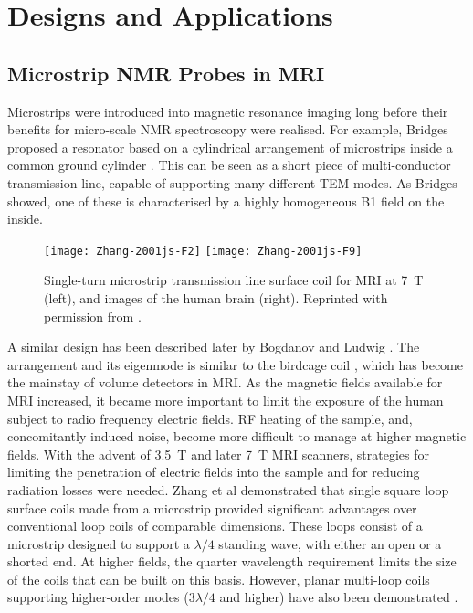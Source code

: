 \section{Designs and Applications}\label{waveguides-in-micro-nmr-literature}

\subsection{Microstrip NMR Probes in MRI}\label{microstrip-nmr-probes-in-mri}

Microstrips were introduced into magnetic resonance imaging long before
their benefits for micro-scale NMR spectroscopy were realised. For
example, Bridges proposed a resonator based on a cylindrical arrangement
of microstrips inside a common ground cylinder \cite{Bridges:1988vz}. This
can be seen as a short piece of multi-conductor transmission line,
capable of supporting many different TEM modes. As Bridges showed, one
of these is characterised by a highly homogeneous B1 field on the
inside. 

\begin{figure}
	\begin{center}
		\texttt{[image: Zhang-2001js-F2]}
		\texttt{[image: Zhang-2001js-F9]}
	\end{center}
	\caption{Single-turn microstrip transmission line surface coil for MRI at 7~T (left), and images of the human brain (right). Reprinted with permission from \cite{Zhang:2001js}.}
	\label{fig-Zhang:2001js-F2}
\end{figure}


A similar design has been described later by Bogdanov and Ludwig
\cite{Bogdanov:2002gv}. The arrangement and its eigenmode is similar to the
birdcage coil \cite{Hayes:1985bw}, which has become the mainstay of volume
detectors in MRI. As the magnetic fields available for MRI increased, it
became more important to limit the exposure of the human subject to
radio frequency electric fields. RF heating of the sample, and,
concomitantly induced noise, become more difficult to manage at higher
magnetic fields. With the advent of 3.5~T and later 7~T MRI scanners,
strategies for limiting the penetration of electric fields into the
sample and for reducing radiation losses were needed. Zhang et
al \cite{Zhang:2001js,Zhang:2006wc} demonstrated that single square loop
surface coils made from a microstrip provided significant advantages
over conventional loop coils of comparable dimensions. These loops
consist of a microstrip designed to support a
$\lambda/4$ standing wave, with either
an open or a shorted end. At higher fields, the quarter wavelength
requirement limits the size of the coils that can be built on this
basis. However, planar multi-loop coils supporting higher-order modes
($3\lambda/4$ and higher) have also been
demonstrated \cite{Zhang:2005cr}. 


